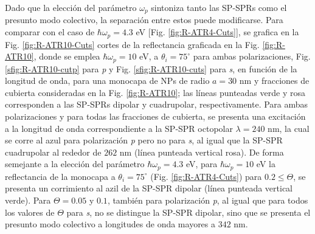 Dado que la elección del parámetro $\omega_p$ sintoniza tanto las SP-SPRs como el presunto modo colectivo, la separación entre estos puede modificarse. Para comparar con el caso de $\hbar\omega_p=4.3$ eV [Fig. \ref{fig:R-ATR4-Cuts}], se grafica en la Fig. \ref{fig:R-ATR10-Cuts} cortes de la reflectancia graficada en la Fig. \ref{fig:R-ATR10}, donde se emplea $\hbar\omega_p = 10$ eV, a $\theta_i = 75^\circ$ para ambas polarizaciones,  Fig. \ref{sfig:R-ATR10-cutp} para \emph{p} y Fig. \ref{sfig:R-ATR10-cuts} para \emph{s}, en  función de la longitud de onda, para una monocapa de NPs de radio $a= 30$ nm  y fracciones de cubierta consideradas en la Fig. \ref{fig:R-ATR10}; las líneas punteadas verde y rosa  corresponden a las SP-SPRs dipolar y cuadrupolar, respectivamente. Para ambas polarizaciones y para todas las fracciones de cubierta, se presenta una excitación a la longitud de onda correspondiente a la SP-SPR octopolar $\lambda=240$ nm, la cual se corre al azul para polarización \emph{p} pero no para \emph{s}, al igual que  la SP-SPR cuadrupolar al rededor de $262$ nm (línea punteada vertical rosa). De forma semejante a la elección del parámetro $\hbar\omega_p = 4.3$ eV, para $\hbar\omega_p=10$ eV la reflectancia de la monocapa a $\theta_i=75^\circ$ (Fig. \ref{fig:R-ATR4-Cuts}) para $0.2\leq\Theta$, se presenta un corrimiento al azil de la SP-SPR dipolar (línea punteada vertical verde). Para $\Theta=0.05$ y $0.1$, también para polarización \emph{p}, al igual que para todos los valores de $\Theta$ para \emph{s}, no se distingue la SP-SPR dipolar, sino que se presenta el presunto modo colectivo a longitudes de onda mayores a $342$ nm.

